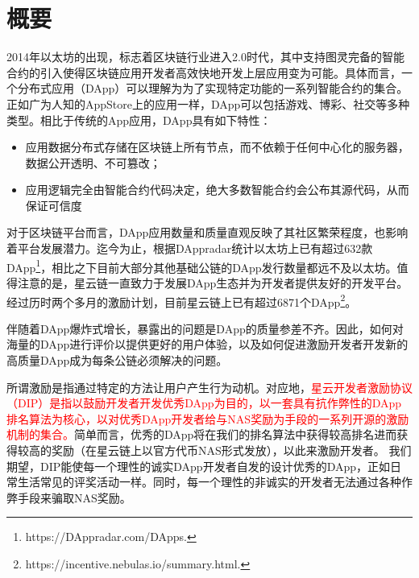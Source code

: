 \section{概要}


2014年以太坊的出现，标志着区块链行业进入2.0时代\cite{buterin2014next}，其中支持图灵完备的智能合约的引入使得区块链应用开发者高效快地开发上层应用变为可能。具体而言，一个分布式应用（DApp）可以理解为为了实现特定功能的一系列智能合约的集合。正如广为人知的AppStore上的应用一样，DApp可以包括游戏、博彩、社交等多种类型。相比于传统的App应用，DApp具有如下特性：

\begin{itemize}
	\item 应用数据分布式存储在区块链上所有节点，而不依赖于任何中心化的服务器，数据公开透明、不可篡改；
	\item 应用逻辑完全由智能合约代码决定，绝大多数智能合约会公布其源代码，从而保证可信度
\end{itemize}

对于区块链平台而言，DApp应用数量和质量直观反映了其社区繁荣程度，也影响着平台发展潜力。迄今为止，根据DAppradar统计以太坊上已有超过632款DApp\footnote{https://DAppradar.com/DApps.}，相比之下目前大部分其他基础公链的DApp发行数量都远不及以太坊。值得注意的是，星云链一直致力于发展DApp生态并为开发者提供友好的开发平台。经过历时两个多月的激励计划，目前星云链上已有超过6871个DApp\footnote{https://incentive.nebulas.io/summary.html.}。

伴随着DApp爆炸式增长，暴露出的问题是DApp的质量参差不齐。因此，如何对海量的DApp进行评价以提供更好的用户体验，以及如何促进激励开发者开发新的高质量DApp成为每条公链必须解决的问题。


所谓激励是指通过特定的方法让用户产生行为动机。对应地，\textcolor{red}{星云开发者激励协议（DIP）是指以鼓励开发者开发优秀DApp为目的，以一套具有抗作弊性的DApp排名算法为核心，以对优秀DApp开发者给与NAS奖励为手段的一系列开源的激励机制的集合。}简单而言，优秀的DApp将在我们的排名算法中获得较高排名进而获得较高的奖励（在星云链上以官方代币NAS形式发放），以此来激励开发者。 我们期望，DIP能使每一个理性的诚实DApp开发者自发的设计优秀的DApp，正如日常生活常见的评奖活动一样。同时，每一个理性的非诚实的开发者无法通过各种作弊手段来骗取NAS奖励。


